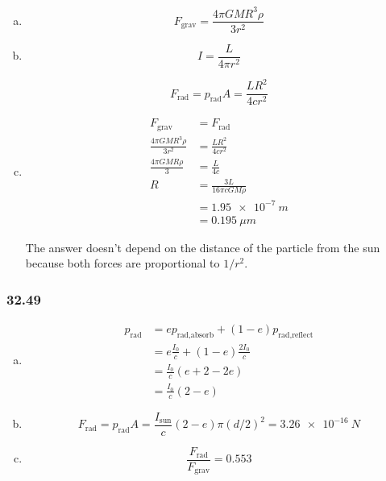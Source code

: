 \documentclass{article}
\begin{document}
\begin{enumerate}[(a)]
  \item \[F_\text{grav} = \frac{4 \pi G M R^3 \rho}{3 r^2}\]

  \item

        \[I = \frac{L}{4 \pi r^2}\]

        \[F_\text{rad} = p_\text{rad} A = \frac{L R^2}{4 c r^2}\]

  \item

        \begin{align*}
          F_\text{grav}                    & = F_\text{rad}                  \\
          \frac{4 \pi G M R^3 \rho}{3 r^2} & = \frac{L R^2}{4 c r^2}         \\
          \frac{4 \pi G M R \rho}{3}       & = \frac{L}{4 c}                 \\
          R                                & = \frac{3 L}{16 \pi c G M \rho} \\
                                           & = \qty{1.95e-7}{m}              \\
                                           & = \qty{0.195}{\mu m}
        \end{align*}

        The answer doesn't depend on the distance of the particle from the sun because both forces are proportional to $1 / r^2$.
\end{enumerate}

\subsubsection{32.49}

\begin{enumerate}[(a)]
  \item

        \begin{align*}
          p_\text{rad} & = e p_\text{rad,absorb} + (1 - e) p_\text{rad,reflect} \\
                       & = e \frac{I_0}{c} + (1 - e) \frac{2 I_0}{c}            \\
                       & = \frac{I_0}{c} (e + 2 - 2 e)                          \\
                       & = \frac{I_0}{c} (2 - e)
        \end{align*}

  \item \[F_\text{rad} = p_\text{rad} A = \frac{I_\text{sun}}{c} (2 - e) \pi (d / 2)^2 = \qty{3.26e-16}{N}\]

  \item \[\frac{F_\text{rad}}{F_\text{grav}} = 0.553\]
\end{enumerate}
\end{document}
